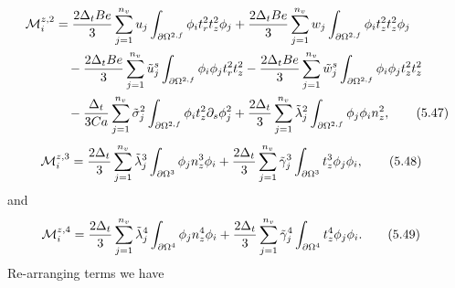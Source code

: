 \documentclass{article}
\begin{document}
\begin{align}
\mathcal{M}_i^{z,2} &= \frac{2\Delta_t Be}{3} \sum_{j=1}^{n_v} u_j \int_{\partial \Omega^{2,f}} \phi_i t_r^2 t_z^2 \phi_j + \frac{2\Delta_t Be}{3} \sum_{j=1}^{n_v} w_j \int_{\partial \Omega^{2,f}} \phi_i t_z^2 t_z^2 \phi_j \nonumber\\
&\quad - \frac{2\Delta_t Be}{3} \sum_{j=1}^{n_v} \tilde{u}_j^s \int_{\partial \Omega^{2,f}} \phi_i \phi_j t_r^2 t_z^2 - \frac{2\Delta_t Be}{3} \sum_{j=1}^{n_v} \tilde{w}_j^s \int_{\partial \Omega^{2,f}} \phi_i \phi_j t_z^2 t_z^2 \nonumber\\
&\quad - \frac{\Delta_t}{3Ca} \sum_{j=1}^{n_v} \tilde{\sigma}_j^2 \int_{\partial \Omega^{2,f}} \phi_i t_z^2 \partial_s \phi_j^2 + \frac{2\Delta_t}{3} \sum_{j=1}^{n_v} \tilde{\lambda}_j^2 \int_{\partial \Omega^{2,f}} \phi_j \phi_i n_z^2, \tag{5.47}
\end{align}
\begin{align}
\mathcal{M}_i^{z,3} &= \frac{2\Delta_t}{3} \sum_{j=1}^{n_v} \tilde{\lambda}_j^3 \int_{\partial \Omega^{3}} \phi_j n_z^3 \phi_i + \frac{2\Delta_t}{3} \sum_{j=1}^{n_v} \tilde{\gamma}_j^3 \int_{\partial \Omega^{3}} t_z^3 \phi_j \phi_i, \tag{5.48}
\end{align}
and
\begin{align}
\mathcal{M}_i^{z,4} &= \frac{2\Delta_t}{3} \sum_{j=1}^{n_v} \tilde{\lambda}_j^4 \int_{\partial \Omega^{4}} \phi_j n_z^4 \phi_i + \frac{2\Delta_t}{3} \sum_{j=1}^{n_v} \tilde{\gamma}_j^4 \int_{\partial \Omega^{4}} t_z^4 \phi_j \phi_i. \tag{5.49}
\end{align}
Re-arranging terms we have
\end{document}
